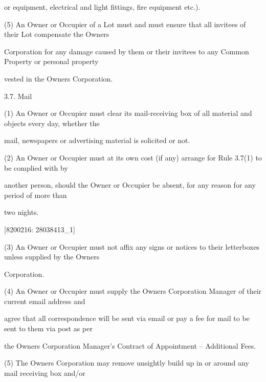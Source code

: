 \documentclass{article}
\begin{document}
{\fontsize{10.02}{1}or equipment, electrical and light fittings, fire equipment etc.). }

{\fontsize{9.962}{1}(5) An Owner or Occupier of a Lot must and must ensure that all invitees of their Lot compensate the Owners }

{\fontsize{10.02}{1}Corporation for any damage caused by them or their invitees to any Common Property or personal property }

{\fontsize{10.02}{1}vested in the Owners Corporation. }

{\fontsize{9.99}{1}3.7. Mail }

{\fontsize{9.962}{1}(1) An Owner or Occupier must clear its mail-receiving box of all material and objects every day, whether the }

{\fontsize{10.02}{1}mail, newspapers or advertising material is solicited or not. }

{\fontsize{9.962}{1}(2) An Owner or Occupier must at its own cost (if any) arrange for Rule 3.7(1) to be complied with by }

{\fontsize{10.02}{1}another person, should the Owner or Occupier be absent, for any reason for any period of more than }

{\fontsize{10.02}{1}two nights. }

\newpage
















{\fontsize{7.02}{1}[8200216: 28038413\_1] }


{\fontsize{9.962}{1}(3) An Owner or Occupier must not affix any signs or notices to their letterboxes unless supplied by the Owners }

{\fontsize{10.02}{1}Corporation. }

{\fontsize{9.962}{1}(4) An Owner or Occupier must supply the Owners Corporation Manager of their current email address and }

{\fontsize{10.02}{1}agree that all correspondence will be sent via email or pay a fee for mail to be sent to them via post as per }

{\fontsize{10.02}{1}the Owners Corporation Manager’s Contract of Appointment – Additional Fees. }

{\fontsize{9.962}{1}(5) The Owners Corporation may remove unsightly build up in or around any mail receiving box and/or }
\end{document}
